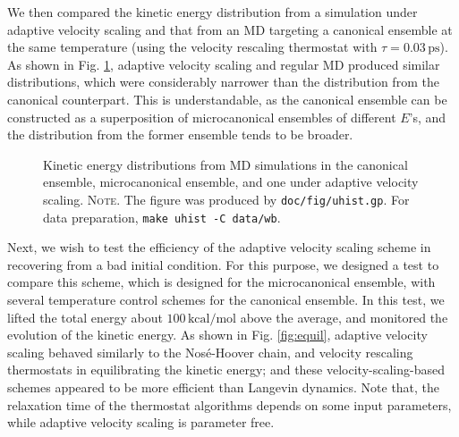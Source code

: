 \documentclass[reprint]{revtex4-1}
\newcommand{\note}[1]{{\color{DarkGreen}\footnotesize \textsc{Note.} #1}}
\begin{document}
We then compared the kinetic energy
distribution from a simulation under adaptive velocity scaling
and that from an MD targeting a canonical ensemble
at the same temperature
(using the velocity rescaling thermostat\cite{bussi2007} with $\tau = 0.03 \, \mathrm{ps}$).
%
As shown in Fig. \ref{fig:uhist},
adaptive velocity scaling and regular MD
produced similar distributions,
which were considerably narrower than the distribution
from the canonical counterpart.
%
This is understandable,
as the canonical ensemble
can be constructed as a superposition
of microcanonical ensembles of different $E$'s,
and the distribution from the former ensemble
tends to be broader.
%
%

\begin{figure}[h]
\begin{center}
  \caption{
    \label{fig:uhist}
    Kinetic energy distributions
    from MD simulations in the canonical ensemble,
    microcanonical ensemble,
    and one under adaptive velocity scaling.
    \note{The figure was produced by \texttt{doc/fig/uhist.gp}.
      For data preparation, \texttt{make uhist -C data/wb}.
    }%
  }
\end{center}
\end{figure}


Next, we wish to test
the efficiency of the adaptive velocity scaling scheme
in recovering from a bad initial condition.
%
For this purpose,
we designed a test to compare this scheme,
which is designed for the microcanonical ensemble,
with several temperature control schemes
for the canonical ensemble.
%
In this test, we lifted the total energy about
$100\,\mathrm{kcal/mol}$ above the average,
and monitored the evolution of the kinetic energy.
%
As shown in Fig. \ref{fig:equil},
adaptive velocity scaling
behaved similarly to
the Nos\'e-Hoover chain\cite{nose1984, nose1984mp, hoover1985, martyna1992},
and velocity rescaling\cite{bussi2007}
thermostats
in equilibrating the kinetic energy;
and these velocity-scaling-based schemes
appeared to be more efficient than Langevin dynamics.
%
Note that, the relaxation time
of the thermostat algorithms
depends on some input parameters,
while adaptive velocity scaling
is parameter free.
\end{document}
